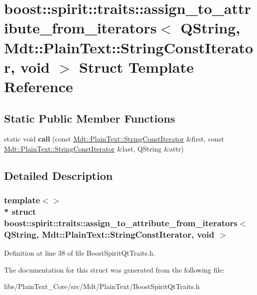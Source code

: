 \hypertarget{structboost_1_1spirit_1_1traits_1_1assign__to__attribute__from__iterators_3_01_q_string_00_01_mda47b874ce92b6c85604c8fe3ab6a7a51}{}\section{boost\+:\+:spirit\+:\+:traits\+:\+:assign\+\_\+to\+\_\+attribute\+\_\+from\+\_\+iterators$<$ Q\+String, Mdt\+:\+:Plain\+Text\+:\+:String\+Const\+Iterator, void $>$ Struct Template Reference}
\label{structboost_1_1spirit_1_1traits_1_1assign__to__attribute__from__iterators_3_01_q_string_00_01_mda47b874ce92b6c85604c8fe3ab6a7a51}
\subsection*{Static Public Member Functions}
\begin{DoxyCompactItemize}
\item 
static void {\bfseries call} (const \hyperlink{struct_mdt_1_1_plain_text_1_1_string_const_iterator}{Mdt\+::\+Plain\+Text\+::\+String\+Const\+Iterator} \&first, const \hyperlink{struct_mdt_1_1_plain_text_1_1_string_const_iterator}{Mdt\+::\+Plain\+Text\+::\+String\+Const\+Iterator} \&last, Q\+String \&attr)\hypertarget{structboost_1_1spirit_1_1traits_1_1assign__to__attribute__from__iterators_3_01_q_string_00_01_mda47b874ce92b6c85604c8fe3ab6a7a51_a828a182f3ce5c8eb9d84ea0bf916fba6}{}\label{structboost_1_1spirit_1_1traits_1_1assign__to__attribute__from__iterators_3_01_q_string_00_01_mda47b874ce92b6c85604c8fe3ab6a7a51_a828a182f3ce5c8eb9d84ea0bf916fba6}

\end{DoxyCompactItemize}


\subsection{Detailed Description}
\subsubsection*{template$<$$>$\\*
struct boost\+::spirit\+::traits\+::assign\+\_\+to\+\_\+attribute\+\_\+from\+\_\+iterators$<$ Q\+String, Mdt\+::\+Plain\+Text\+::\+String\+Const\+Iterator, void $>$}



Definition at line 38 of file Boost\+Spirit\+Qt\+Traits.\+h.



The documentation for this struct was generated from the following file\+:\begin{DoxyCompactItemize}
\item 
libs/\+Plain\+Text\+\_\+\+Core/src/\+Mdt/\+Plain\+Text/Boost\+Spirit\+Qt\+Traits.\+h\end{DoxyCompactItemize}
